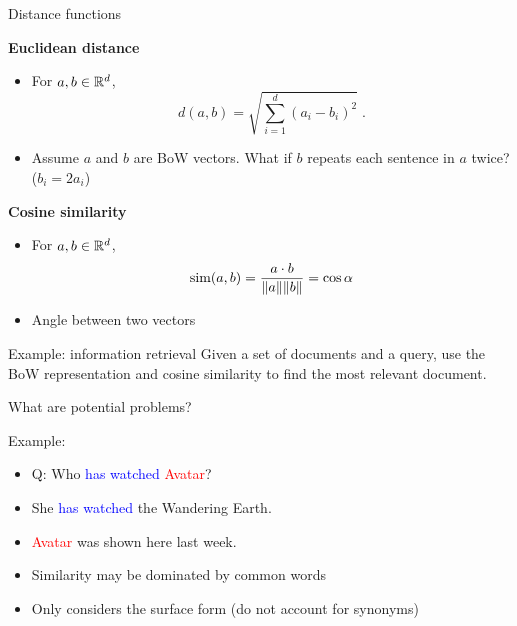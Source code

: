 \documentclass[usenames,dvipsnames,notes,11pt,aspectratio=169]{beamer}
\begin{document}
\begin{frame}
    {Distance functions}

    \textbf{Euclidean distance}\\
    \begin{itemize}
        \item[] For $a,b\in\mathbb{R}^d$,
            $$
            d(a,b) = \sqrt{\sum_{i=1}^d(a_i-b_i)^2} \;.
            $$
            \pause
        \item[] Assume $a$ and $b$ are BoW vectors. What if $b$ repeats each sentence in $a$ twice?
            \pause ($b_i=2a_i$)
    \end{itemize}

    \pause
    \textbf{Cosine similarity}\\
    \begin{itemize}
        \item[] For $a,b\in\mathbb{R}^d$,
            $$
            \text{sim}(a,b) = \frac{a\cdot b}{\|a\|\|b\|} = \cos\alpha
            $$
        \item[] Angle between two vectors
    \end{itemize}
\end{frame}

\begin{frame}
    {Example: information retrieval}
    Given a set of documents and a query,
    use the BoW representation and cosine similarity
    to find the most relevant document.

    What are potential problems?

    Example:\\
    \begin{itemize}
        \item[] Q: Who \textcolor{blue}{has watched} \textcolor{red}{Avatar}?
        \item[] She \textcolor{blue}{has} \textcolor{blue}{watched} the Wandering Earth.
        \item[] \textcolor{red}{Avatar} was shown here last week.
    \end{itemize}

    \pause
    \begin{itemize}
        \item Similarity may be dominated by common words
        \item Only considers the surface form (\eg do not account for synonyms)
    \end{itemize}
    
\end{frame}
\end{document}
